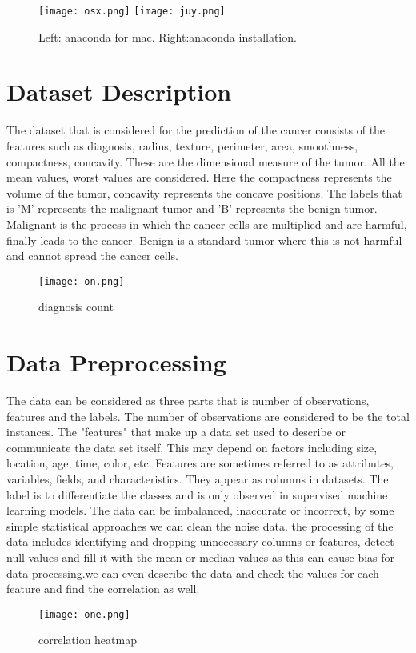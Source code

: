 \documentclass[conference]{IEEEtran}
\begin{document}
\begin{figure}[h]
\texttt{[image: osx.png]}\hfill
\texttt{[image: juy.png]}\hfill
\caption{Left: anaconda for mac. Right:anaconda installation.}
\end{figure}

\section{Dataset Description}
The dataset that is considered for the prediction of the cancer consists of the features such as diagnosis, radius, texture, perimeter, area, smoothness, compactness, concavity. These are the dimensional measure of the tumor. All the mean values, worst values are considered. Here the compactness represents the volume of the tumor, concavity represents the concave positions. The labels that is 'M' represents the malignant tumor and 'B' represents the benign tumor. Malignant is the  process in which the cancer cells are multiplied and are harmful, finally leads to the cancer. Benign is a standard tumor where this is not harmful and cannot spread the cancer cells.
\begin{figure}[h!]
    \centerline{\texttt{[image: on.png]}}
    \caption{diagnosis count}
\end{figure}
\section{Data Preprocessing}
The data can be considered as three parts that is number of observations, features and the labels. The number of observations are considered to be the total instances. The "features" that make up a data set used to describe or communicate the data set itself. This may depend on factors including size, location, age, time, color, etc. Features are sometimes referred to as attributes, variables, fields, and characteristics. They appear as columns in datasets. The label is to differentiate the classes and is only observed in supervised machine learning models. 
The data can be imbalanced, inaccurate or incorrect, by some simple statistical approaches we can clean the noise data. the processing of the data includes identifying and dropping unnecessary columns or features, detect null values and fill it with the mean or median values as this can cause bias for data processing.we can even describe the data and check the values for each feature and find the correlation as well.
\begin{figure}[h!]
    \centerline{\texttt{[image: one.png]}}
    \caption{correlation heatmap}
\end{figure}
\end{document}
